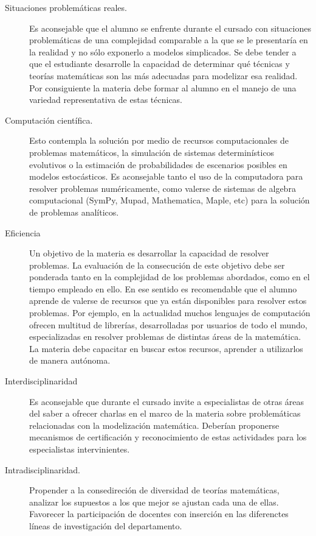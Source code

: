 \documentclass[12pt]{article}
\begin{document}
\begin{enumerate}
\begin{description}
  \item[Situaciones problemáticas reales.] Es aconsejable que el alumno se enfrente durante el cursado con situaciones problemáticas de una complejidad comparable a la que se le presentaría en la realidad y no sólo exponerlo a modelos simplicados. Se debe tender a que el estudiante desarrolle la capacidad de determinar qué técnicas y teorías matemáticas son las más adecuadas para modelizar esa realidad.  Por consiguiente la materia debe formar al alumno en el manejo de una variedad representativa de estas técnicas.
  
  \item[Computación científica.]  Esto contempla la solución por medio de recursos computacionales de problemas matemáticos, la simulación de sistemas determinísticos evolutivos o la estimación de probabilidades de escenarios posibles en modelos estocásticos.  Es aconsejable tanto el uso de la computadora para resolver problemas  numéricamente, como valerse de sistemas de algebra computacional (SymPy, Mupad, Mathematica, Maple, etc) para la solución de problemas analíticos. 
  
  \item[Eficiencia] Un objetivo  de la materia es desarrollar la capacidad de resolver problemas. La evaluación de la consecución de este objetivo debe ser ponderada tanto en la complejidad de los problemas abordados, como en el tiempo empleado en ello. En ese sentido es recomendable que el alumno aprende de valerse de recursos que ya están disponibles para resolver estos problemas. Por ejemplo, en la actualidad muchos lenguajes de computación ofrecen multitud de librerías, desarrolladas por usuarios de todo el mundo, especializadas en resolver problemas de distintas áreas de la matemática.  La materia debe capacitar en buscar estos recursos, aprender a utilizarlos de manera autónoma. 
  
  
  \item[Interdisciplinaridad] Es aconsejable que durante el cursado invite a especialistas de otras áreas del saber a ofrecer charlas en el marco de la materia sobre problemáticas relacionadas con la modelización matemática. Deberían proponerse mecanismos de certificación y reconocimiento de estas actividades para los especialistas intervinientes.
  
  \item[Intradisciplinaridad.] Propender a la consedireción de diversidad de teorías matemáticas, analizar los supuestos a los que mejor se ajustan cada una de ellas. Favorecer la participación de  docentes con inserción en las diferenctes líneas de investigación del departamento.  



\end{description}
\end{enumerate}
\end{document}
